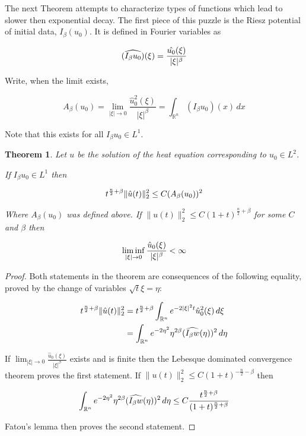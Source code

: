 \documentclass{amsart}
\newtheorem {Theorem}  {Theorem}
\numberwithin{Theorem}{section}
\numberwithin{equation}{section}
\theoremstyle{definition}
\theoremstyle{remark}
\begin{document}
The next Theorem attempts to characterize types of functions which lead to slower then exponential decay.  The first piece of this puzzle is the Riesz potential of initial data, $I_\beta(u_0)$.  It is defined in Fourier variables as

\begin{equation}
(\widehat{I_\beta u_0})(\xi)=\frac{\hat{u_0}(\xi)}{|\xi|^\beta}\notag
\end{equation}

Write, when the limit exists,

\begin{equation}\label{Apotential}
A_\beta(u_0) = \lim_{|\xi|\rightarrow 0}\frac{\hat{u}_0^2(\xi)}{|\xi|^\beta} = \int_{\mathbb{R}^n}(I_\beta u_0)(x)\,dx
\end{equation}

Note that this exists for all $I_{\beta} u_0\in L^1$.

\begin{Theorem}

Let $u$ be the solution of the heat equation corresponding to $u_0\in L^2$.

If  $I_{\beta} u_0\in L^1$ then

\begin{equation}
t^{\frac{n}{2}+\beta}\|\hat{u}(t)\|_2^2 \leq C (A_\beta(u_0))^2\notag
\end{equation}

Where  $A_\beta(u_0)$ was defined above. If $\|u(t)\|_2^2\leq C(1+t)^{\frac{n}{2}+\beta}$ for some $C$ and $\beta$ then

\begin{equation}
\liminf_{|\xi|\rightarrow 0}\frac{\hat{u}_0(\xi)}{|\xi|^\beta}<\infty\notag
\end{equation}
\end{Theorem}

\begin{proof}

Both statements in the theorem are consequences of the following equality, proved by the change of variables $\sqrt{t}\xi=\eta$:

\begin{align}
t^{\frac{n}{2}+\beta}\|\hat{u}(t)\|_2^2 &= t^{\frac{n}{2}+\beta}\int_{\mathbb{R}^n}e^{-2|\xi|^2t}\hat{u}_0^2(\xi)\,d\xi\notag\\
&=\int_{\mathbb{R}^n}e^{-2\eta^2}\eta^{2\beta}(\widehat{I_\beta w}(\eta))^2\, d\eta\notag
\end{align}

If $\lim_{|\xi|\rightarrow 0}\frac{\hat{u}_0(\xi)}{|\xi|^\beta}$ exists and is finite then the Lebesque dominated convergence theorem proves the first statement.  If $\|u(t)\|_2^2\leq C(1+t)^{-\frac{n}{2}-\beta}$ then

\begin{equation}
\int_{\mathbb{R}^n}e^{-2\eta^2}\eta^{2\beta}(\widehat{I_\beta w}(\eta))^2\, d\eta\notag \leq C\frac{t^{\frac{n}{2}+\beta}}{(1+t)^{\frac{n}{2}+\beta}}\notag
\end{equation}

Fatou's lemma then proves the second statement.

\end{proof}
\end{document}
